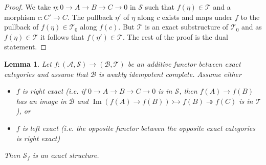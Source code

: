 \documentclass[11pt,a4paper]{amsart}
\theoremstyle{plain}
\newtheorem{lem}[thm]{Lemma}
\theoremstyle{definition}
\DeclareMathOperator{\Bild}{Im}
\newcommand{\defl}{\twoheadrightarrow}
\newcommand{\infl}{\rightarrowtail}
\newcommand{\mcA}{\mathcal{A}}
\newcommand{\mcB}{\mathcal{B}}
\newcommand{\mcS}{\mathcal{S}}
\newcommand{\mcT}{\mathcal{T}}
\begin{document}
\begin{proof}
We take $\eta \colon 0 \to A \to B \to C \to 0$ in $\mcS$ such that $f(\eta) \in \mcT$ and a morphism $c\colon C'\to C$. The pullback $\eta'$ of $\eta $ along $c$ exists and maps under $f$ to the pullback of $f(\eta) \in \mcT_0$ along $f(c)$. But $\mcT$ is an exact substructure of $\mcT_0$ and as $f(\eta) \in \mcT$ it follows that $f(\eta')\in \mcT$. The rest of the proof is the dual statement.  
\end{proof}


\begin{lem} \label{leftEx}
Let $f\colon (\mcA, \mcS) \to (\mcB, \mcT)$ be an additive functor between exact categories and assume that $\mcB$ is weakly idempotent complete. 
Assume either  
\begin{itemize}
    \item[(1)] $f$ is right exact (i.e. if $0\to A\to B \to C \to 0$ is in $\mcS$, then $f(A) \to f(B)$ has an image in $\mcB$ and $\Bild (f(A)\to f(B)) \infl f(B) \defl f(C) $ is in $\mcT$), or
    \item[(2)] $f$ is left exact (i.e. the opposite functor between the opposite exact categories is right exact) 
\end{itemize}
Then $\mcS_f$ is an exact structure.
\end{lem}
\end{document}
